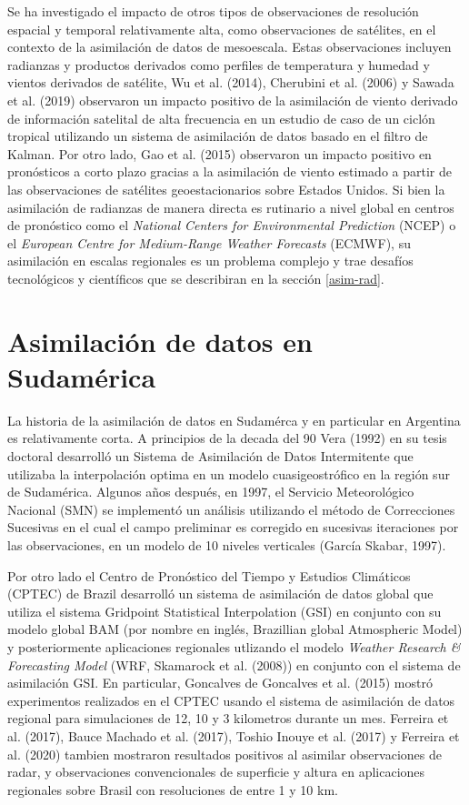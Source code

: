 \documentclass[12pt,oneside,a4paper]{reedthesis}
\begin{document}
Se ha investigado el impacto de otros tipos de observaciones de resolución espacial y temporal relativamente alta, como observaciones de satélites, en el contexto de la asimilación de datos de mesoescala. Estas observaciones incluyen radianzas y productos derivados como perfiles de temperatura y humedad y vientos derivados de satélite, Wu et al. (2014), Cherubini et al. (2006) y Sawada et al. (2019) observaron un impacto positivo de la asimilación de viento derivado de información satelital de alta frecuencia en un estudio de caso de un ciclón tropical utilizando un sistema de asimilación de datos basado en el filtro de Kalman. Por otro lado, Gao et al. (2015) observaron un impacto positivo en pronósticos a corto plazo gracias a la asimilación de viento estimado a partir de las observaciones de satélites geoestacionarios sobre Estados Unidos. Si bien la asimilación de radianzas de manera directa es rutinario a nivel global en centros de pronóstico como el \emph{National Centers for Environmental Prediction} (NCEP) o el \emph{European Centre for Medium-Range Weather Forecasts} (ECMWF), su asimilación en escalas regionales es un problema complejo y trae desafíos tecnológicos y científicos que se describiran en la sección \ref{asim-rad}.

\hypertarget{asimilaciuxf3n-de-datos-en-sudamuxe9rica}{%
\section{Asimilación de datos en Sudamérica}\label{asimilaciuxf3n-de-datos-en-sudamuxe9rica}}

La historia de la asimilación de datos en Sudamérca y en particular en Argentina es relativamente corta. A principios de la decada del 90 Vera (1992) en su tesis doctoral desarrolló un Sistema de Asimilación de Datos Intermitente que utilizaba la interpolación optima en un modelo cuasigeostrófico en la región sur de Sudamérica. Algunos años después, en 1997, el Servicio Meteorológico Nacional (SMN) se implementó un
análisis utilizando el método de Correcciones Sucesivas en el cual el campo preliminar
es corregido en sucesivas iteraciones por las observaciones, en un modelo de 10 niveles verticales (García Skabar, 1997).

Por otro lado el Centro de Pronóstico del Tiempo y Estudios Climáticos (CPTEC) de Brazil desarrolló un sistema de asimilación de datos global que utiliza el sistema Gridpoint Statistical Interpolation (GSI) en conjunto con su modelo global BAM (por nombre en inglés, Brazillian global Atmospheric Model) y posteriormente aplicaciones regionales utlizando el modelo \emph{Weather Research \& Forecasting Model} (WRF, Skamarock et al. (2008)) en conjunto con el sistema de asimilación GSI. En particular, Goncalves de Goncalves et al. (2015) mostró experimentos realizados en el CPTEC usando el sistema de asimilación de datos regional para simulaciones de 12, 10 y 3 kilometros durante un mes. Ferreira et al. (2017), Bauce Machado et al. (2017), Toshio Inouye et al. (2017) y Ferreira et al. (2020) tambien mostraron resultados positivos al asimilar observaciones de radar, y observaciones convencionales de superficie y altura en aplicaciones regionales sobre Brasil con resoluciones de entre 1 y 10 km.
\end{document}
